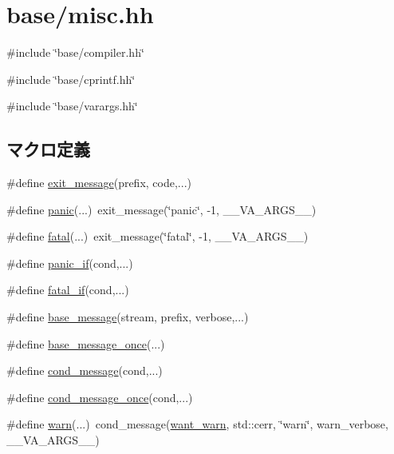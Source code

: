 \hypertarget{base_2misc_8hh}{
\section{base/misc.hh}
\label{base_2misc_8hh}
}
{\ttfamily \#include \char`\"{}base/compiler.hh\char`\"{}}\par
{\ttfamily \#include \char`\"{}base/cprintf.hh\char`\"{}}\par
{\ttfamily \#include \char`\"{}base/varargs.hh\char`\"{}}\par
\subsection*{マクロ定義}
\begin{DoxyCompactItemize}
\item 
\#define \hyperlink{base_2misc_8hh_a6b2097421f31dc3c2920ac8a335b8197}{exit\_\-message}(prefix, code,...)
\item 
\#define \hyperlink{base_2misc_8hh_a1445e207e36c97ff84c54b47288cea19}{panic}(...)~exit\_\-message(\char`\"{}panic\char`\"{}, -\/1, \_\-\_\-VA\_\-ARGS\_\-\_\-)
\item 
\#define \hyperlink{base_2misc_8hh_acad519418dbfdd70c1208711e609c80e}{fatal}(...)~exit\_\-message(\char`\"{}fatal\char`\"{}, -\/1, \_\-\_\-VA\_\-ARGS\_\-\_\-)
\item 
\#define \hyperlink{base_2misc_8hh_af5c59b879d6a32dc657018ab3d30198f}{panic\_\-if}(cond,...)
\item 
\#define \hyperlink{base_2misc_8hh_a2127c4f5f05a25aea5ffc00677fc3ffe}{fatal\_\-if}(cond,...)
\item 
\#define \hyperlink{base_2misc_8hh_a9ecbb7f86584a1e39ac8ade9f5dccbeb}{base\_\-message}(stream, prefix, verbose,...)
\item 
\#define \hyperlink{base_2misc_8hh_ad0490a7a875db4f79a4724fb96055a62}{base\_\-message\_\-once}(...)
\item 
\#define \hyperlink{base_2misc_8hh_a9462d8ae08a9dc81e7a7b8d1dd937aa0}{cond\_\-message}(cond,...)
\item 
\#define \hyperlink{base_2misc_8hh_a1240d20e0d7b2f5063f632f444207143}{cond\_\-message\_\-once}(cond,...)
\item 
\#define \hyperlink{base_2misc_8hh_a8224a361dddd2ad59b411982e5ea746f}{warn}(...)~cond\_\-message(\hyperlink{base_2misc_8hh_a77f6725c0d2349664643937fe56cafc0}{want\_\-warn}, std::cerr, \char`\"{}warn\char`\"{}, warn\_\-verbose, \_\-\_\-VA\_\-ARGS\_\-\_\-)
\item 

\end{DoxyCompactItemize}
